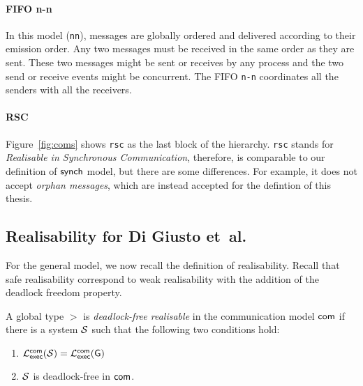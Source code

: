 
\paragraph{FIFO n-n}
In this model (\verb|nn|), messages are globally ordered and delivered according to 
their emission order. Any two messages must be received in the same order 
as they are sent. These two messages might be sent or receives by any process 
and the two send or receive events might be concurrent. The FIFO \verb|n-n| 
coordinates all the senders with all the receivers.

\paragraph{RSC}
Figure~\ref{fig:coms} shows \verb|rsc| as the last block of the hierarchy.
\verb|rsc| stands for \emph{Realisable in Synchronous Communication}, therefore, 
is comparable to our definition of $\mathsf{synch}$ model, but there are 
some differences. For example, it does not accept \emph{orphan messages}, 
which are instead accepted for the defintion of this thesis.

\subsection{Realisability for Di Giusto et~al.}
For the general model, we now recall the definition of 
realisability. Recall that safe realisability correspond to weak 
realisability with the addition of the deadlock freedom property.

\bigskip

\begin{definition}\label{def:realisability}
    A global type $\gt$ is \emph{deadlock-free realisable}
    in the communication model
    $\mathsf{com}$
    if there is a system $\mathcal{S}$ such that the following two conditions hold:
    \begin{enumerate}
    \item $\mathcal{L}_{\mathsf{exec}}^{\mathsf{com}}(\mathcal{S}) = 
                \mathcal{L}_{\mathsf{exec}}^{\mathsf{com}}(\mathsf{G})$
    \item $\mathcal{S}$ is deadlock-free in $\mathsf{com}$.
    \end{enumerate}
\end{definition}

